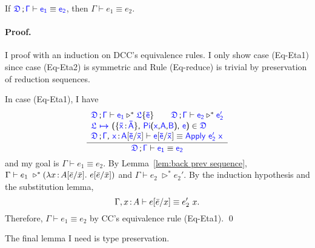 \begin{lemma}If $\targetcon \vdash \target{e_1} \equiv \target{e_2}$, then $\Gamma \vdash e_1 \equiv e_2$.
\paragraph{Proof.} I proof with an induction on DCC's equivalence rules. I only show case (Eq-Eta1) since case (Eq-Eta2) is symmetric and Rule (Eq-reduce) is trivial by preservation of reduction sequences.

In case (Eq-Eta1), I have
\begin{equation}
	\frac
	{\begin{array}{l}
	  \target{\fdef}\semicolon \target{\Gamma} \vdash \target{e_1} \triangleright^* \targetlab{\flabel}{\bar{e}} \qquad
      \target{\fdef}\semicolon \target{\Gamma} \vdash \target{e_2} \triangleright^* \target{e_2'} \\
      \itemdef{\target{\flabel}}{\itemtype{\bar{x}}{\bar{A}}}{\targetpi{x}{A}{B}}{\target{e}} \in \target{\fdef} \\
      \target{\fdef}\semicolon \target{\Gamma}\sfcomma \itemtype{x}{A} \targetsub{\bar{e}}{\bar{x}} \vdash 
      \target{e}\targetsub{\bar{e}}{\bar{x}} \equiv \targetapp{e_2'}{x}
	\end{array}}
	{\target{\fdef}\semicolon \target{\Gamma} \vdash \target{e_1} \equiv \target{e_2}}
\end{equation}
and my goal is $\Gamma \vdash e_1 \equiv e_2$. By Lemma~\ref{lem:back prev sequence}, 
$\Gamma \vdash e_1\ \triangleright^* (\lambda x\hspace{0.5mm}{:}\hspace{0.5mm} A[\bar{e}\slash\bar{x}].\ e[\bar{e}\slash\bar{x}])$ and 
$\Gamma \vdash e_2\ \triangleright^* e_2'$.
By the induction hypothesis and the substitution lemma, 
\[
\Gamma, x \hspace{0.5mm}{:}\hspace{0.5mm} A \vdash e[\bar{e}\slash x] \equiv e_2'\ x.
\]
Therefore, $\Gamma \vdash e_1 \equiv e_2$ by CC's equivalence rule (Eq-Eta1). \qed
\end{lemma}

The final lemma I need is type preservation.

